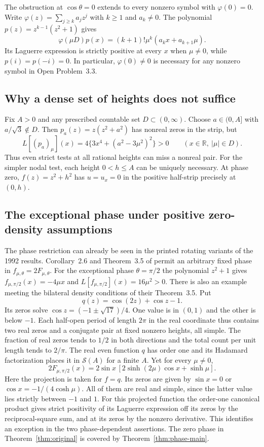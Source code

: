 \documentclass[11pt,a4paper]{article}
\numberwithin{equation}{section}
\begin{document}
The obstruction at $\cos\theta=0$ extends to every nonzero symbol with
$\varphi(0)=0$. Write $\varphi(z)=\sum_{j\ge k}a_jz^j$ with
$k\ge1$ and $a_k\ne0$. The polynomial $p(z)=z^{k-1}(z^2+1)$ gives
\[
 \varphi(\mu D)p(x)=(k+1)!\mu^k(a_kx+a_{k+1}\mu).
\]
Its Laguerre expression is strictly positive at every $x$ when
$\mu\ne0$, while $p(i)=p(-i)=0$. In particular, $\varphi(0)\ne0$
is necessary for any nonzero symbol in Open Problem~3.3.
\subsection{Why a dense set of heights does not suffice}
Fix $A>0$ and any prescribed countable set $D\subset(0,\infty)$.
Choose $a\in(0,A]$ with $a/\sqrt3\notin D$. Then $p_a(z)=z(z^2+a^2)$
has nonreal zeros in the strip, but
\[
 L[(p_a)_\mu](x)=4\{3x^4+(a^2-3\mu^2)^2\}>0
 \qquad (x\in\mathbb R,\ |\mu|\in D).
\]
Thus even strict tests at all rational heights can miss a nonreal pair.
For the simpler nodal test, each height $0<h\le A$ can be uniquely
necessary. At phase zero, $f(z)=z^2+h^2$ has
$u=u_x=0$ in the positive half-strip precisely at $(0,h)$.

\subsection{The exceptional phase under positive zero-density assumptions}
The phase restriction can already be seen in the printed rotating
variants of the 1992 results. Corollary~2.6 and Theorem~3.5 of
\cite[pp.~386, 394--395]{CSV} permit an arbitrary fixed phase in
$f_{\mu,\theta}=2F_{\mu,\theta}$. For the exceptional phase
$\theta=\pi/2$ the polynomial $z^2+1$ gives
$f_{\mu,\pi/2}(x)=-4\mu x$ and $L[f_{\mu,\pi/2}](x)=16\mu^2>0$.
There is also an example meeting the bilateral density conditions of
their Theorem~3.5. Put
\[
 q(z)=\cos(2z)+\cos z-1.
\]
Its zeros solve $\cos z=(-1\pm\sqrt{17})/4$. One value is in $(0,1)$
and the other is below $-1$. Each half-open period of length $2\pi$
in the real coordinate thus contains two real zeros and a conjugate
pair at fixed nonzero heights, all simple. The fraction of real zeros
tends to $1/2$ in both directions and the total count per unit length
tends to $2/\pi$. The real even function $q$ has order one and its
Hadamard factorization places it in $\mathcal S(A)$ for a finite $A$.
Yet for every $\mu\ne0$,
\[
 2F_{\mu,\pi/2}(x)=2\sin x\,[2\sinh(2\mu)\cos x+\sinh\mu].
\]
Here the projection is taken for $f=q$. Its zeros are given by
$\sin x=0$ or $\cos x=-1/(4\cosh\mu)$. All of them are real and
simple, since the latter value lies strictly between $-1$ and $1$.
For this projected function the order-one canonical product gives
strict positivity of its Laguerre expression off its zeros by the
reciprocal-square sum, and at its zeros by the nonzero derivative.
This identifies an exception in the two phase-dependent assertions.
The zero phase in Theorem~\ref{thm:original} is covered by
Theorem~\ref{thm:phase-main}.
\end{document}
